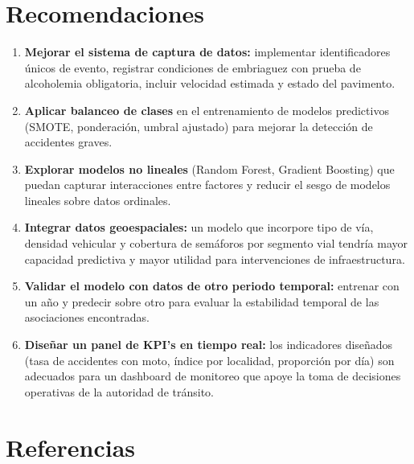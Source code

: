 \documentclass[11pt,a4paper]{article}
\begin{document}
\section{Recomendaciones}

\begin{enumerate}
  \item \textbf{Mejorar el sistema de captura de datos:} implementar identificadores
        únicos de evento, registrar condiciones de embriaguez con prueba de alcoholemia
        obligatoria, incluir velocidad estimada y estado del pavimento.
  \item \textbf{Aplicar balanceo de clases} en el entrenamiento de modelos predictivos
        (SMOTE, ponderación, umbral ajustado) para mejorar la detección de accidentes
        graves.
  \item \textbf{Explorar modelos no lineales} (Random Forest, Gradient Boosting) que
        puedan capturar interacciones entre factores y reducir el sesgo de modelos
        lineales sobre datos ordinales.
  \item \textbf{Integrar datos geoespaciales:} un modelo que incorpore tipo de vía,
        densidad vehicular y cobertura de semáforos por segmento vial tendría mayor
        capacidad predictiva y mayor utilidad para intervenciones de infraestructura.
  \item \textbf{Validar el modelo con datos de otro periodo temporal:} entrenar con un
        año y predecir sobre otro para evaluar la estabilidad temporal de las asociaciones
        encontradas.
  \item \textbf{Diseñar un panel de KPI's en tiempo real:} los indicadores diseñados
        (tasa de accidentes con moto, índice por localidad, proporción por día) son
        adecuados para un dashboard de monitoreo que apoye la toma de decisiones operativas
        de la autoridad de tránsito.
\end{enumerate}

\section*{Referencias}
\end{document}
